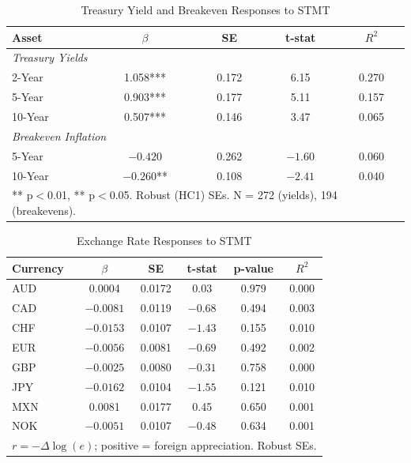 \documentclass[12pt]{article}
\begin{document}
\begin{table}
\centering
\caption{Treasury Yield and Breakeven Responses to STMT}
\label{tab:treasury}
\begin{tabular}{lcccc}
\toprule
Asset & $\beta$ & SE & t-stat & $R^2$ \\
\midrule
\multicolumn{5}{l}{\textit{Treasury Yields}} \\
2-Year & 1.058*** & 0.172 & 6.15 & 0.270 \\
5-Year & 0.903*** & 0.177 & 5.11 & 0.157 \\
10-Year & 0.507*** & 0.146 & 3.47 & 0.065 \\
\midrule
\multicolumn{5}{l}{\textit{Breakeven Inflation}} \\
5-Year & $-0.420$ & 0.262 & $-1.60$ & 0.060 \\
10-Year & $-0.260$** & 0.108 & $-2.41$ & 0.040 \\
\bottomrule
\multicolumn{5}{l}{\footnotesize *** p$<$0.01, ** p$<$0.05. Robust (HC1) SEs. N = 272 (yields), 194 (breakevens).}
\end{tabular}
\end{table}

\begin{table}
\centering
\caption{Exchange Rate Responses to STMT}
\label{tab:fx}
\begin{tabular}{lccccc}
\toprule
Currency & $\beta$ & SE & t-stat & p-value & $R^2$ \\
\midrule
AUD & 0.0004 & 0.0172 & 0.03 & 0.979 & 0.000 \\
CAD & $-0.0081$ & 0.0119 & $-0.68$ & 0.494 & 0.003 \\
CHF & $-0.0153$ & 0.0107 & $-1.43$ & 0.155 & 0.010 \\
EUR & $-0.0056$ & 0.0081 & $-0.69$ & 0.492 & 0.002 \\
GBP & $-0.0025$ & 0.0080 & $-0.31$ & 0.758 & 0.000 \\
JPY & $-0.0162$ & 0.0104 & $-1.55$ & 0.121 & 0.010 \\
MXN & 0.0081 & 0.0177 & 0.45 & 0.650 & 0.001 \\
NOK & $-0.0051$ & 0.0107 & $-0.48$ & 0.634 & 0.001 \\
\bottomrule
\multicolumn{6}{l}{\footnotesize $r = -\Delta\log(e)$; positive = foreign appreciation. Robust SEs.}
\end{tabular}
\end{table}
\end{document}
